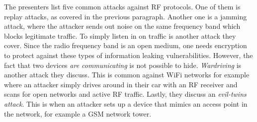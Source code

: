 The presenters list five common attacks against RF protocols. One of them is replay attacks, as covered in the previous paragraph. Another one is a jamming attack, where the attacker sends out noise on the same frequency band which blocks legitimate traffic. To simply listen in on traffic is another attack they cover. Since the radio frequency band is an open medium, one needs encryption to protect against these types of information leaking vulnerabilities. However, the fact that two devices \textit{are communicating} is not possible to hide. \textit{Wardriving} is another attack they discuss. This is common against WiFi networks for example where an attacker simply drives around in their car with an RF receiver and scans for open networks and active RF traffic. Lastly, they discuss an \textit{evil-twins attack}. This is when an attacker sets up a device that mimics an access point in the network, for example a GSM network tower.
